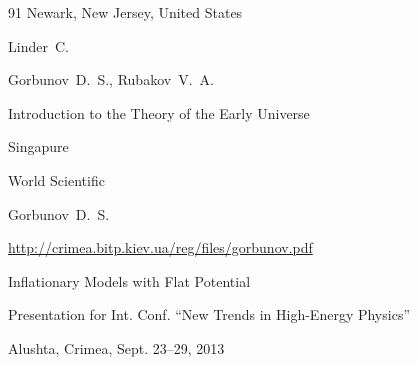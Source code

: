 \begin{thebibliography}{91}
\publaddr Newark, New Jersey, United States

\by Linder~C.









\by Gorbunov~D.~S., Rubakov~V.~A.

\book  Introduction to the Theory of the Early Universe

\publaddr Singapure

\publ World Scientific










\by Gorbunov~D.~S. 


\elink \url{http://crimea.bitp.kiev.ua/reg/files/gorbunov.pdf}

\preprint Inflationary Models with Flat Potential 

\preprintinfo Presentation for Int.  Conf. ``New Trends in High-Energy Physics''

\procinfo Alushta, Crimea, Sept. 23--29, 2013





\end{thebibliography}





\EngDate



\newpage

\Russian



%

